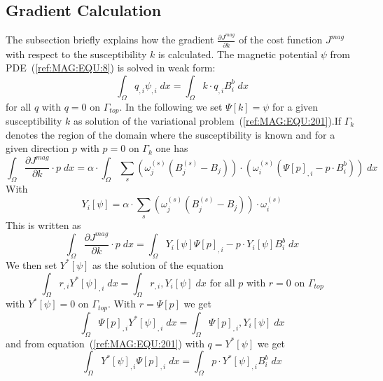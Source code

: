 \subsection{Gradient Calculation}
The subsection briefly explains how the gradient $\frac{\partial J^{mag}}{\partial k}$  of the cost function $J^{mag}$ with respect to the 
susceptibility $k$ is calculated. 
The magnetic potential $\psi$ from PDE~(\ref{ref:MAG:EQU:8})  is solved in weak form:
\begin{equation}\label{ref:MAG:EQU:201}
\int_{\Omega} q_{,i} \psi_{,i} \; dx  = \int_{\Omega}  k \cdot q_{,i}  B^b_i \; dx 
\end{equation} 
for all $q$ with $q=0$ on $\Gamma_{top}$. In the following we set $\Psi[k]=\psi$ for a given susceptibility $k$ as solution
of the variational problem~(\ref{ref:MAG:EQU:201}).If $\Gamma_{k}$ denotes the region of the domain where the susceptibility is known
and for a given direction $p$ with $p=0$ on $\Gamma_{k}$ one has
\begin{equation}\label{ref:MAG:EQU:201}
\int_{\Omega}   \frac{\partial J^{mag}}{\partial k} \cdot p \; dx  = \alpha \cdot  \int_{\Omega}  
\sum_{s} (\omega^{(s)}_j 
( B^{(s)}_j-B_{j}))  \cdot ( \omega^{(s)}_i ( \Psi[p]_{,i} - p  \cdot B^b_i  ) ) \; dx  
\end{equation} 
With 
\begin{equation}\label{ref:MAG:EQU:202c}
Y_i[\psi]=  \alpha \cdot \sum_{s} (\omega^{(s)}_j 
(B^{(s)}_j - B_{j}) )  \cdot \omega^{(s)}_i  
\end{equation} 
This is written as 
\begin{equation}\label{ref:MAG:EQU:201}
\int_{\Omega}   \frac{\partial J^{mag}}{\partial k} \cdot p \;  dx  = \int_{\Omega}  
Y_i[\psi] \Psi[p]_{,i} - p \cdot Y_i[\psi]B^b_i   \; dx  
\end{equation} 
We then set $Y^*[\psi]$ as the solution of the equation 
\begin{equation}\label{ref:MAG:EQU:202d}
\int_{\Omega} r_{,i} Y^*[\psi]_{,i} \; dx  =  \int_{\Omega} r_{,i} ,Y_i[\psi]  \; dx  \mbox{ for all } p \mbox{ with } r=0 \mbox{ on } \Gamma_{top}
\end{equation} 
with $Y^*[\psi]=0$ on $\Gamma_{top}$. With $r=\Psi[p]$ we get
\begin{equation}\label{ref:MAG:EQU:202d}
\int_{\Omega} \Psi[p]_{,i} Y^*[\psi]_{,i} \; dx  =  \int_{\Omega} \Psi[p]_{,i} ,Y_i[\psi]  \; dx
\end{equation} 
and from equation~(\ref{ref:MAG:EQU:201}) with $q=Y^*[\psi]$ we get
\begin{equation}\label{ref:MAG:EQU:20e}
\int_{\Omega} Y^*[\psi]_{,i}  \Psi[p]_{,i} \; dx  = \int_{\Omega}  p \cdot Y^*[\psi]_{,i}  B^b_i \; dx  
\end{equation}

